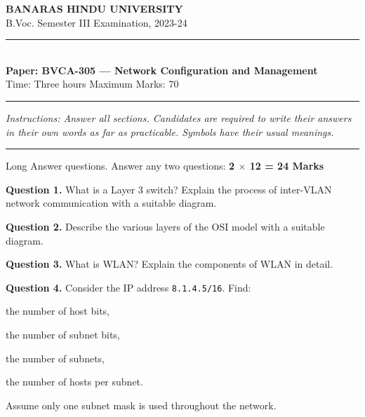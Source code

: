 \documentclass[11pt,a4paper]{article}
\begin{document}
\begin{center}
  {\large\bfseries BANARAS HINDU UNIVERSITY}\\[2pt]
  {\normalsize B.Voc. Semester III Examination, 2023-24}\\[6pt]
  \rule{0.8\linewidth}{0.5pt}\\[6pt]
  {\large\bfseries Paper: BVCA-305 --- Network Configuration and Management}\\[4pt]
  {\normalsize Time: Three hours \hfill Maximum Marks: 70}
\end{center}

\rule{\linewidth}{0.4pt}

\smallskip



\noindent   \textit{Instructions: Answer all sections. Candidates are required to write their answers in their own words as far as practicable. Symbols have their usual meanings.}

\bigskip




\rule{\linewidth}{0.4pt}\smallskip

Long Answer questions. Answer any two questions: \hfill   \textbf{2 $ \times$ 12 = 24 Marks}

\medskip



\noindent   \textbf{Question 1.} What is a Layer 3 switch? Explain the process of inter-VLAN network communication with a suitable diagram.

\medskip



\noindent   \textbf{Question 2.} Describe the various layers of the OSI model with a suitable diagram.

\medskip



\noindent   \textbf{Question 3.} What is WLAN? Explain the components of WLAN in detail.

\medskip



\noindent   \textbf{Question 4.} Consider the IP address   \texttt{8.1.4.5/16}. Find:

\begin{parts}
  \item the number of host bits,
  \item the number of subnet bits,
  \item the number of subnets,
  \item the number of hosts per subnet.
\end{parts}
Assume only one subnet mask is used throughout the network.
\end{document}
